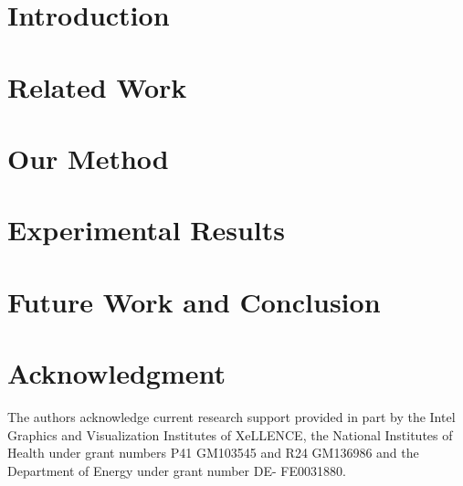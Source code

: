 \section{Introduction}
\label{sec:introduction}


\vspace{-2mm}
\section{Related Work}
\label{sec:related}


\vspace{-2mm}
\section{Our Method}
\label{sec:method}


\vspace{-2mm}
\section{Experimental Results}
\label{sec:results}



\vspace{-2mm}
\section{Future Work and Conclusion}
\label{sec:conclusion}


\section*{Acknowledgment}
The authors acknowledge current research support provided in part by the Intel Graphics and Visualization Institutes of XeLLENCE, the National Institutes of Health under grant numbers P41 GM103545 and R24 GM136986 and the Department of Energy under grant number DE- FE0031880.
